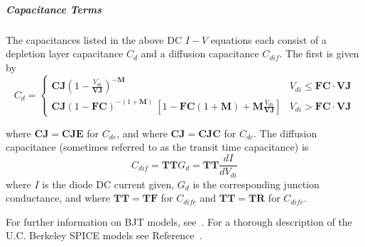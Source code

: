 \subparagraph{Capacitance Terms}
The capacitances listed in the above DC $I-V$ equations each consist of a
depletion layer capacitance $C_{d}$ and
a diffusion capacitance $C_{dif}$.  The first is given by
\[
C_d = \left\{
\begin{array}{ll}
\mathbf{CJ} \left(1 - \frac{V_{di}}{\mathbf{VJ}} \right)^{\mathbf{-M}} &
V_{di} \leq \mathbf{FC \cdot VJ} \\
\mathbf{CJ} \left(1 - \mathbf{FC} \right)^{-(1+\mathbf{M})} \
\left[1 - \mathbf{FC}(1 + \mathbf{M}) + \mathbf{M}
\frac{V_{di}}{\mathbf{VJ}} \right]
& V_{di} > \mathbf{FC \cdot VJ}
\end{array}
\right. \]

where $\mathbf{CJ}=\mathbf{CJE}$ for $C_{de}$, and where $\mathbf{CJ}=
\mathbf{CJC}$ for $C_{dc}$.
The diffusion capacitance (sometimes referred to as the transit time
capacitance) is
\[
C_{dif} = \mathbf{TT} G_d = \mathbf{TT} \frac{dI}{dV_{di}}
\]
where $I$ is the diode DC current given, $G_d$ is the corresponding junction
conductance, and where $\mathbf{TT}=\mathbf{TF}$ for $C_{dife}$ and
$\mathbf{TT}=\mathbf{TR}$ for $C_{difc}$.




For further information on BJT models, see~\cite{Grove:1967}.  For a thorough
description of the U.C. Berkeley SPICE models see
Reference~\cite{Antognetti:1988}.


